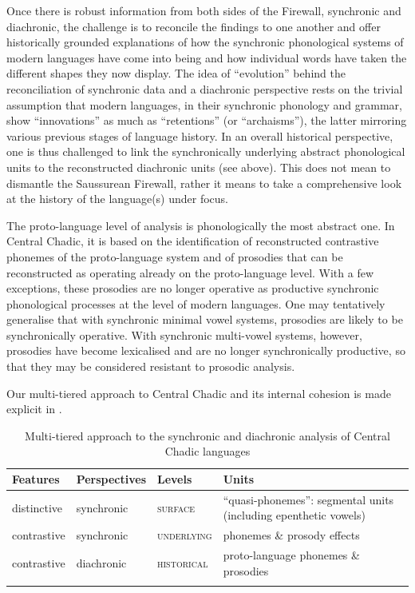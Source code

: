 \documentclass[output=paper]{langscibook}
\begin{document}
Once there is robust information from both sides of the Firewall, synchronic and diachronic, the challenge is to reconcile the findings to one another and offer historically grounded explanations of how the synchronic phonological systems of modern languages have come into being and how individual words have taken the different shapes they now display. The idea of ``evolution'' behind the reconciliation of synchronic data and a diachronic perspective rests on the trivial assumption that modern languages, in their synchronic phonology and grammar, show ``innovations'' as much as ``retentions'' (or ``archaisms''), the latter mirroring various previous stages of language history. In an overall historical perspective, one is thus challenged to link the synchronically underlying abstract phonological units to the reconstructed diachronic units (see  above). This does not mean to dismantle the Saussurean Firewall, rather it means to take a comprehensive look at the history of the language(s) under focus.

The proto-language level of analysis is phonologically the most abstract one. In Central Chadic, it is based on the identification of reconstructed contrastive phonemes of the proto-language system and of prosodies that can be reconstructed as operating already on the proto-language level. With a few exceptions, these prosodies are no longer operative as productive synchronic phonological processes at the level of modern languages. One may tentatively generalise that with synchronic minimal vowel systems, prosodies are likely to be synchronically operative. With synchronic multi-vowel systems, however, prosodies have become lexicalised and are no longer synchronically productive, so that they may be considered resistant to prosodic analysis. 

Our multi-tiered approach to Central Chadic and its internal cohesion is made explicit in .

\begin{table}
\caption{Multi-tiered approach to the synchronic and diachronic analysis of Central Chadic languages}
\label{tab:wolff:5}
\begin{tabularx}{\textwidth}{lllQ}
\lsptoprule
 Features & Perspectives & Levels & Units\\
\midrule
distinctive & synchronic & {\scshape surface} & ``quasi-phonemes'': segmental units (including epenthetic vowels)\\
contrastive & synchronic & {\scshape underlying} & phonemes \& prosody effects\\
contrastive & diachronic & {\scshape historical} & proto-language phonemes \& prosodies\\
\lspbottomrule
\end{tabularx}
\end{table}
\end{document}
